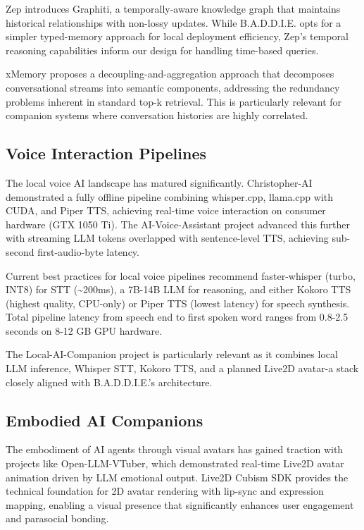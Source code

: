 \documentclass[sigconf]{acmart}
\begin{document}
Zep \cite{arxiv2501.13956} introduces Graphiti, a temporally-aware knowledge graph that maintains historical relationships with non-lossy updates. While B.A.D.D.I.E. opts for a simpler typed-memory approach for local deployment efficiency, Zep's temporal reasoning capabilities inform our design for handling time-based queries.

xMemory \cite{arxiv2602.02007} proposes a decoupling-and-aggregation approach that decomposes conversational streams into semantic components, addressing the redundancy problems inherent in standard top-k retrieval. This is particularly relevant for companion systems where conversation histories are highly correlated.

\subsection{Voice Interaction Pipelines}

The local voice AI landscape has matured significantly. Christopher-AI \cite{christopher-ai} demonstrated a fully offline pipeline combining whisper.cpp, llama.cpp with CUDA, and Piper TTS, achieving real-time voice interaction on consumer hardware (GTX 1050 Ti). The AI-Voice-Assistant project \cite{hemantbk-ai} advanced this further with streaming LLM tokens overlapped with sentence-level TTS, achieving sub-second first-audio-byte latency.

Current best practices for local voice pipelines \cite{insiderllm2026voice} recommend faster-whisper (turbo, INT8) for STT (\textasciitilde 200ms), a 7B-14B LLM for reasoning, and either Kokoro TTS (highest quality, CPU-only) or Piper TTS (lowest latency) for speech synthesis. Total pipeline latency from speech end to first spoken word ranges from 0.8-2.5 seconds on 8-12 GB GPU hardware.

The Local-AI-Companion project \cite{liilk-companion} is particularly relevant as it combines local LLM inference, Whisper STT, Kokoro TTS, and a planned Live2D avatar-a stack closely aligned with B.A.D.D.I.E.'s architecture.

\subsection{Embodied AI Companions}

The embodiment of AI agents through visual avatars has gained traction with projects like Open-LLM-VTuber, which demonstrated real-time Live2D avatar animation driven by LLM emotional output. Live2D Cubism SDK provides the technical foundation for 2D avatar rendering with lip-sync and expression mapping, enabling a visual presence that significantly enhances user engagement and parasocial bonding.
\end{document}
